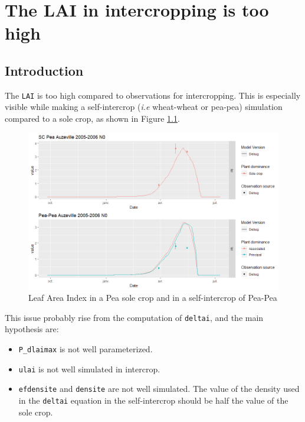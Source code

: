 \documentclass[
]{book}
\providecommand{\tightlist}{%
  \setlength{\itemsep}{0pt}\setlength{\parskip}{0pt}}
\begin{document}
\hypertarget{LAItoohigh}{%
\chapter{The LAI in intercropping is too high}\label{LAItoohigh}}

\hypertarget{introduction-9}{%
\section{Introduction}\label{introduction-9}}

The \texttt{LAI} is too high compared to observations for intercropping. This is especially visible while making a self-intercrop (\emph{i.e} wheat-wheat or pea-pea) simulation compared to a sole crop, as shown in Figure \ref{fig:LAItoohigh}.

\begin{figure}
\centering
\includegraphics{img/LAI_high_PP.png}
\caption{\label{fig:LAItoohigh}Leaf Area Index in a Pea sole crop and in a self-intercrop of Pea-Pea}
\end{figure}

This issue probably rise from the computation of \texttt{deltai}, and the main hypothesis are:

\begin{itemize}
\tightlist
\item
  \texttt{P\_dlaimax} is not well parameterized.\\
\item
  \texttt{ulai} is not well simulated in intercrop.\\
\item
  \texttt{efdensite} and \texttt{densite} are not well simulated. The value of the density used in the \texttt{deltai} equation in the self-intercrop should be half the value of the sole crop.
\end{itemize}
\end{document}
